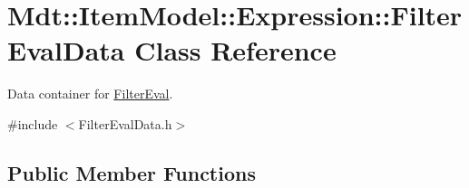 \hypertarget{class_mdt_1_1_item_model_1_1_expression_1_1_filter_eval_data}{}\section{Mdt\+:\+:Item\+Model\+:\+:Expression\+:\+:Filter\+Eval\+Data Class Reference}
\label{class_mdt_1_1_item_model_1_1_expression_1_1_filter_eval_data}


Data container for \hyperlink{struct_mdt_1_1_item_model_1_1_expression_1_1_filter_eval}{Filter\+Eval}.  




{\ttfamily \#include $<$Filter\+Eval\+Data.\+h$>$}

\subsection*{Public Member Functions}
